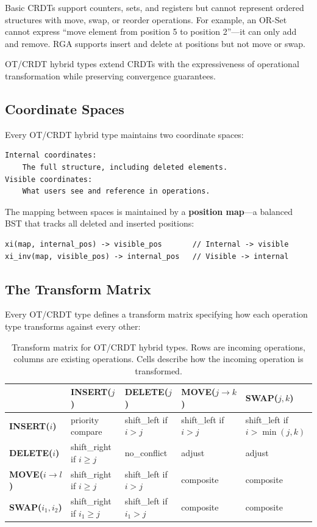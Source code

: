 \documentclass[11pt,a4paper]{article}
\begin{document}
Basic CRDTs support counters, sets, and registers but cannot represent ordered structures with move, swap, or reorder operations. For example, an OR-Set cannot express ``move element from position 5 to position 2''---it can only add and remove. RGA supports insert and delete at positions but not move or swap.

OT/CRDT hybrid types extend CRDTs with the expressiveness of operational transformation while preserving convergence guarantees.

\subsection{Coordinate Spaces}

Every OT/CRDT hybrid type maintains two coordinate spaces:

\begin{lstlisting}
Internal coordinates:
    The full structure, including deleted elements.
Visible coordinates:
    What users see and reference in operations.
\end{lstlisting}

The mapping between spaces is maintained by a \textbf{position map}---a balanced BST that tracks all deleted and inserted positions:

\begin{lstlisting}
xi(map, internal_pos) -> visible_pos       // Internal -> visible
xi_inv(map, visible_pos) -> internal_pos   // Visible -> internal
\end{lstlisting}

\subsection{The Transform Matrix}

Every OT/CRDT type defines a transform matrix specifying how each operation type transforms against every other:

\vspace{6pt}
\begin{table}[H]
\centering
\renewcommand{\arraystretch}{1.3}
\begin{tabular}{l|llll}
\multicolumn{1}{c}{} & \textbf{INSERT($j$)} & \textbf{DELETE($j$)} & \textbf{MOVE($j \to k$)} & \textbf{SWAP($j,k$)} \\
\midrule
\textbf{INSERT($i$)}       & priority compare & shift\_left if $i>j$  & shift\_left if $i>j$     & shift\_left if $i>\min(j,k)$ \\
\textbf{DELETE($i$)}       & shift\_right if $i\geq j$ & no\_conflict  & adjust     & adjust \\
\textbf{MOVE($i\to l$)}    & shift\_right if $i\geq j$ & shift\_left if $i>j$ & composite  & composite \\
\textbf{SWAP($i_1,i_2$)}   & shift\_right if $i_1\geq j$ & shift\_left if $i_1>j$ & composite  & composite \\
\end{tabular}
\caption{Transform matrix for OT/CRDT hybrid types. Rows are incoming operations, columns are existing operations. Cells describe how the incoming operation is transformed.}
\label{tab:transform}
\end{table}
\end{document}
